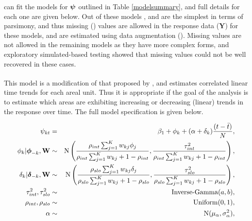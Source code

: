 \documentclass[article, nojss]{jss}
\newcommand{\bd}[1]{\ensuremath{\mbox{\boldmath $#1$}}}
\begin{document}
 can fit the models for $\bd{\psi}$ outlined in Table \ref{modelsummary}, and full details for each one are given below. Out of these models ,  and  are the simplest in terms of parsimony, and thus missing () values are allowed in the response data ($\mathbf{Y}$) for these models, and are estimated using data augmentation (\citealp{tanner1987}). Missing values are not allowed in the remaining models as they have more complex forms, and exploratory simulated-based testing showed that missing values could not be well recovered in these cases.\\

\\
This model  is a modification of that proposed by \cite{bernardinelli1995}, and estimates correlated linear time trends for each areal unit. Thus it is  appropriate if the goal of the analysis is to estimate which areas are exhibiting increasing or decreasing (linear) trends in the response over time. The full model specification is given below.

\begin{eqnarray}
\psi_{kt}&=&\beta_{1} + \phi_k + (\alpha + \delta_k)\frac{(t - \bar{t})}{N},\label{carlinear}\\
\phi_k|\bd{\phi}_{-k},\mathbf{W}&\sim&\mbox{N}\left(\frac{\rho_{int}\sum_{j=1}^Kw_{kj}\phi_j}{\rho_{int}\sum_{j=1}^Kw_{kj} + 1-\rho_{int}}, \frac{\tau^2_{int}}{\rho_{int}\sum_{j=1}^Kw_{kj} + 1-\rho_{int}}\right),\nonumber\\
\delta_k|\bd{\delta}_{-k},\mathbf{W}&\sim&\mbox{N}\left(\frac{\rho_{slo}\sum_{j=1}^Kw_{kj}\delta_j}{\rho_{slo}\sum_{j=1}^Kw_{kj} + 1-\rho_{slo}}, \frac{\tau^2_{slo}}{\rho_{slo}\sum_{j=1}^Kw_{kj} + 1-\rho_{slo}}\right),\nonumber\\
\tau^2_{int}, \tau^2_{slo}&\sim&\mbox{Inverse-Gamma}(a,b),\nonumber\\
\rho_{int},\rho_{slo}&\sim&\mbox{Uniform}(0,1),\nonumber\\
\alpha&\sim&\mbox{N}(\mu_{\alpha}, \sigma^2_{\alpha}),\nonumber
\end{eqnarray}
\end{document}
